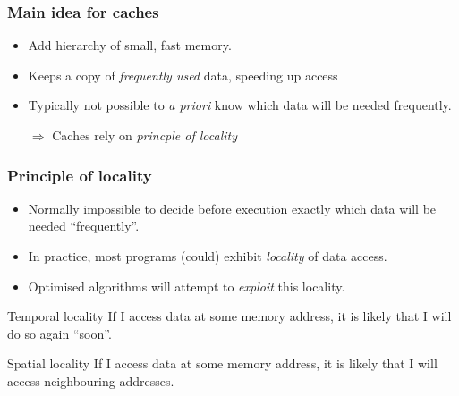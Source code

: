 \documentclass[presentation,aspectratio=43,10pt]{beamer}
\begin{document}
\begin{frame}
  \frametitle{Main idea for caches}
  \begin{itemize}
  \item Add hierarchy of small, fast memory.
  \item Keeps a copy of \emph{frequently used} data, speeding up
    access
  \item Typically not possible to \emph{a priori} know which data will
    be needed frequently.
  \item[$\Rightarrow$] Caches rely on \emph{princple of locality}
  \end{itemize}
\end{frame}
\begin{frame}
  \frametitle{Principle of locality}
  \begin{itemize}
  \item Normally impossible to decide before execution exactly which
    data will be needed ``frequently''.
  \item In practice, most programs (could) exhibit \emph{locality} of data
    access.
  \item Optimised algorithms will attempt to \emph{exploit} this
    locality.
  \end{itemize}

  \begin{block}{Temporal locality}
    If I access data at some memory address, it is likely that I will
    do so again ``soon''.
  \end{block}
  \begin{block}{Spatial locality}
    If I access data at some memory address, it is likely that I will
    access neighbouring addresses.
  \end{block}  
\end{frame}
\end{document}
